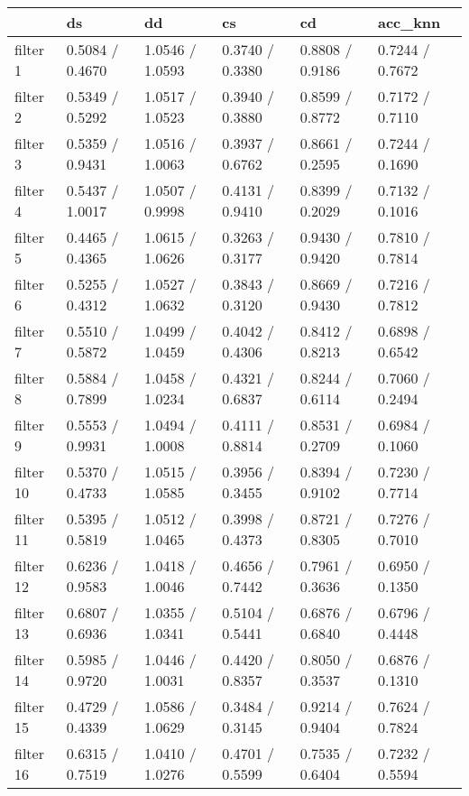 \begin{tabular}{llllll}
\toprule
{} &               ds &               dd &               cs &               cd &          acc\_knn \\
\midrule
filter 1  &  0.5084 / 0.4670 &  1.0546 / 1.0593 &  0.3740 / 0.3380 &  0.8808 / 0.9186 &  0.7244 / 0.7672 \\
filter 2  &  0.5349 / 0.5292 &  1.0517 / 1.0523 &  0.3940 / 0.3880 &  0.8599 / 0.8772 &  0.7172 / 0.7110 \\
filter 3  &  0.5359 / 0.9431 &  1.0516 / 1.0063 &  0.3937 / 0.6762 &  0.8661 / 0.2595 &  0.7244 / 0.1690 \\
filter 4  &  0.5437 / 1.0017 &  1.0507 / 0.9998 &  0.4131 / 0.9410 &  0.8399 / 0.2029 &  0.7132 / 0.1016 \\
filter 5  &  0.4465 / 0.4365 &  1.0615 / 1.0626 &  0.3263 / 0.3177 &  0.9430 / 0.9420 &  0.7810 / 0.7814 \\
filter 6  &  0.5255 / 0.4312 &  1.0527 / 1.0632 &  0.3843 / 0.3120 &  0.8669 / 0.9430 &  0.7216 / 0.7812 \\
filter 7  &  0.5510 / 0.5872 &  1.0499 / 1.0459 &  0.4042 / 0.4306 &  0.8412 / 0.8213 &  0.6898 / 0.6542 \\
filter 8  &  0.5884 / 0.7899 &  1.0458 / 1.0234 &  0.4321 / 0.6837 &  0.8244 / 0.6114 &  0.7060 / 0.2494 \\
filter 9  &  0.5553 / 0.9931 &  1.0494 / 1.0008 &  0.4111 / 0.8814 &  0.8531 / 0.2709 &  0.6984 / 0.1060 \\
filter 10 &  0.5370 / 0.4733 &  1.0515 / 1.0585 &  0.3956 / 0.3455 &  0.8394 / 0.9102 &  0.7230 / 0.7714 \\
filter 11 &  0.5395 / 0.5819 &  1.0512 / 1.0465 &  0.3998 / 0.4373 &  0.8721 / 0.8305 &  0.7276 / 0.7010 \\
filter 12 &  0.6236 / 0.9583 &  1.0418 / 1.0046 &  0.4656 / 0.7442 &  0.7961 / 0.3636 &  0.6950 / 0.1350 \\
filter 13 &  0.6807 / 0.6936 &  1.0355 / 1.0341 &  0.5104 / 0.5441 &  0.6876 / 0.6840 &  0.6796 / 0.4448 \\
filter 14 &  0.5985 / 0.9720 &  1.0446 / 1.0031 &  0.4420 / 0.8357 &  0.8050 / 0.3537 &  0.6876 / 0.1310 \\
filter 15 &  0.4729 / 0.4339 &  1.0586 / 1.0629 &  0.3484 / 0.3145 &  0.9214 / 0.9404 &  0.7624 / 0.7824 \\
filter 16 &  0.6315 / 0.7519 &  1.0410 / 1.0276 &  0.4701 / 0.5599 &  0.7535 / 0.6404 &  0.7232 / 0.5594 \\
\bottomrule
\end{tabular}
